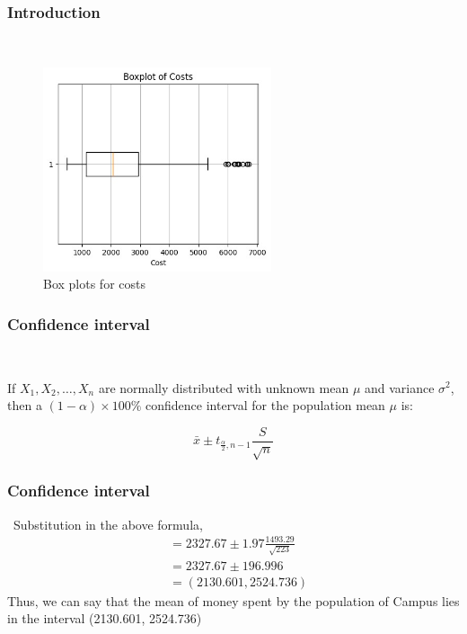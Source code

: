 \documentclass{beamer}
\begin{document}
\begin{frame}
    \frametitle{Introduction }\
    \begin{figure}
    \centering
    \includegraphics[width=0.6\textwidth]{Boxplots for costs.jpg} %
    \caption{Box plots for costs } %
    \label{fig:Box plots for costs } %
    \end{figure}
\end{frame}

\begin{frame}
    \frametitle{Confidence interval}\
    \begin{block}{}
        If $X_1, X_2, \ldots, X_n$ are normally distributed with unknown mean $\mu$ and variance $\sigma^2$, then a $(1 - \alpha) \times 100\%$ confidence interval for the population mean $\mu$ is:

        \[
        \bar{x} \pm t_{\frac{\alpha}{2}, n-1} \frac{S}{\sqrt{n}}
        \]

    \end{block}
\end{frame}


\begin{frame}
    \frametitle{Confidence interval}\
    Substitution in the above formula, 
    \begin{align}
    &= 2327.67 \pm 1.97 \frac{1493.29}{\sqrt{223}} \\ &= 2327.67 \pm 196.996 \nonumber \\
    &= (2130.601, 2524.736)
    \end{align}
    Thus, we can say that the mean of money spent by the population of Campus lies in the interval (2130.601, 2524.736)
\end{frame}
\end{document}
